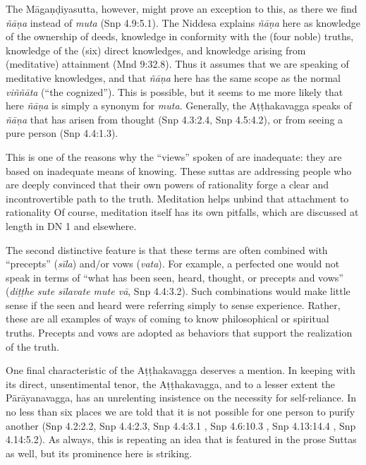 \documentclass[12pt,openany]{book}%
\begin{document}
The \textsanskrit{Māgaṇḍiyasutta}, however, might prove an exception to this, as there we find \textit{\textsanskrit{ñāṇa}} instead of \textit{muta} (Snp 4.9:5.1). The Niddesa explains \textit{\textsanskrit{ñāṇa}} here as knowledge of the ownership of deeds, knowledge in conformity with the (four noble) truths, knowledge of the (six) direct knowledges, and knowledge arising from (meditative) attainment (Mnd 9:32.8). Thus it assumes that we are speaking of meditative knowledges, and that \textit{\textsanskrit{ñāṇa}} here has the same scope as the normal \textit{\textsanskrit{viññāta}} (“the cognized”). This is possible, but it seems to me more likely that here \textit{\textsanskrit{ñāṇa}} is simply a synonym for \textit{muta}. Generally, the \textsanskrit{Aṭṭhakavagga} speaks of \textit{\textsanskrit{ñāṇa}} that has arisen from thought (Snp 4.3:2.4, Snp 4.5:4.2), or from seeing a pure person (Snp 4.4:1.3).

This is one of the reasons why the “views” spoken of are inadequate: they are based on inadequate means of knowing. These suttas are addressing people who are deeply convinced that their own powers of rationality forge a clear and incontrovertible path to the truth. Meditation helps unbind that attachment to rationality Of course, meditation itself has its own pitfalls, which are discussed at length in DN 1 and elsewhere.

The second distinctive feature is that these terms are often combined with “precepts” (\textit{\textsanskrit{sīla}}) and/or vows (\textit{vata}). For example, a perfected one would not speak in terms of “what has been seen, heard, thought, or precepts and vows” (\textit{\textsanskrit{diṭṭhe} sute \textsanskrit{sīlavate} mute \textsanskrit{vā}}, Snp 4.4:3.2). Such combinations would make little sense if the seen and heard were referring simply to sense experience. Rather, these are all examples of ways of coming to know philosophical or spiritual truths. Precepts and vows are adopted as behaviors that support the realization of the truth.

One final characteristic of the \textsanskrit{Aṭṭhakavagga} deserves a mention. In keeping with its direct, unsentimental tenor, the \textsanskrit{Aṭṭhakavagga}, and to a lesser extent the \textsanskrit{Pārāyanavagga}, has an unrelenting insistence on the necessity for self-reliance. In no less than six places we are told that it is not possible for one person to purify another (Snp 4.2:2.2, Snp 4.4:2.3, Snp 4.4:3.1 , Snp 4.6:10.3 , Snp 4.13:14.4 , Snp 4.14:5.2). As always, this is repeating an idea that is featured in the prose Suttas as well, but its prominence here is striking.
\end{document}
